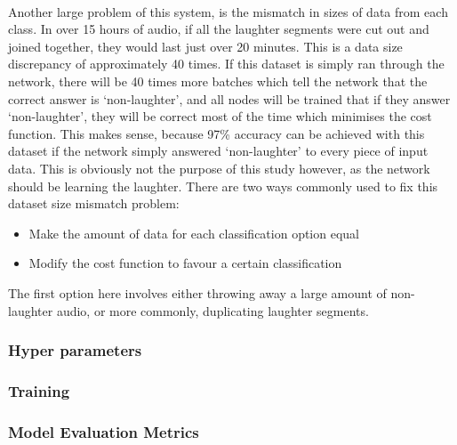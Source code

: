 \documentclass[a4paper,11pt,notitlepage]{article}
\begin{document}
\\
Another large problem of this system, is the mismatch in sizes of data from each class. In over 15 hours of audio, if all the laughter segments were cut out and joined together, they would last just over 20 minutes. This is a data size discrepancy of approximately 40 times. If this dataset is simply ran through the network, there will be 40 times more batches which tell the network that the correct answer is `non-laughter', and all nodes will be trained that if they answer `non-laughter', they will be correct most of the time which minimises the cost function. This makes sense, because 97\% accuracy can be achieved with this dataset if the network simply answered `non-laughter' to every piece of input data. This is obviously not the purpose of this study however, as the network should be learning the laughter. There are two ways commonly used to fix this dataset size mismatch problem:
\begin{itemize}
\item Make the amount of data for each classification option equal
\item Modify the cost function to favour a certain classification
\end{itemize}
The first option here involves either throwing away a large amount of non-laughter audio, or more commonly, duplicating laughter segments. 

\subsubsection{Hyper parameters}


\subsubsection{Training}


\subsubsection{Model Evaluation Metrics}
\end{document}
